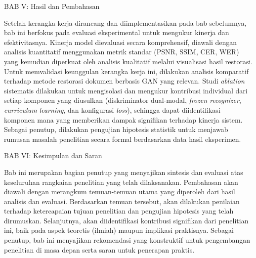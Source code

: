 \vspace{0.5em}
BAB V: Hasil dan Pembahasan

Setelah kerangka kerja dirancang dan diimplementasikan pada bab sebelumnya, bab ini berfokus pada evaluasi eksperimental untuk mengukur kinerja dan efektivitasnya. Kinerja model dievaluasi secara komprehensif, diawali dengan analisis kuantitatif menggunakan metrik standar (PSNR, SSIM, CER, WER) yang kemudian diperkuat oleh analisis kualitatif melalui visualisasi hasil restorasi. Untuk memvalidasi keunggulan kerangka kerja ini, dilakukan analisis komparatif terhadap metode restorasi dokumen berbasis GAN yang relevan. Studi \textit{ablation} sistematis dilakukan untuk mengisolasi dan mengukur kontribusi individual dari setiap komponen yang diusulkan (diskriminator dual-modal, \textit{frozen recognizer}, \textit{curriculum learning}, dan konfigurasi \textit{loss}), sehingga dapat diidentifikasi komponen mana yang memberikan dampak signifikan terhadap kinerja sistem. Sebagai penutup, dilakukan pengujian hipotesis statistik untuk menjawab rumusan masalah penelitian secara formal berdasarkan data hasil eksperimen.

\vspace{0.5em}
BAB VI: Kesimpulan dan Saran

Bab ini merupakan bagian penutup yang menyajikan sintesis dan evaluasi atas keseluruhan rangkaian penelitian yang telah dilaksanakan. Pembahasan akan diawali dengan merangkum temuan-temuan utama yang diperoleh dari hasil analisis dan evaluasi. Berdasarkan temuan tersebut, akan dilakukan penilaian terhadap ketercapaian tujuan penelitian dan pengujian hipotesis yang telah dirumuskan. Selanjutnya, akan diidentifikasi kontribusi signifikan dari penelitian ini, baik pada aspek teoretis (ilmiah) maupun implikasi praktisnya. Sebagai penutup, bab ini menyajikan rekomendasi yang konstruktif untuk pengembangan penelitian di masa depan serta saran untuk penerapan praktis.



